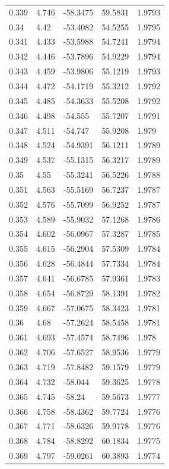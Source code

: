 \begin{tabular}{lllll}
0.339 & 4.746 & -58.3475 & 59.5831 & 1.9793 \\
0.34 & 4.42 & -53.4082 & 54.5255 & 1.9795 \\
0.341 & 4.433 & -53.5988 & 54.7241 & 1.9794 \\
0.342 & 4.446 & -53.7896 & 54.9229 & 1.9794 \\
0.343 & 4.459 & -53.9806 & 55.1219 & 1.9793 \\
0.344 & 4.472 & -54.1719 & 55.3212 & 1.9792 \\
0.345 & 4.485 & -54.3633 & 55.5208 & 1.9792 \\
0.346 & 4.498 & -54.555 & 55.7207 & 1.9791 \\
0.347 & 4.511 & -54.747 & 55.9208 & 1.979 \\
0.348 & 4.524 & -54.9391 & 56.1211 & 1.9789 \\
0.349 & 4.537 & -55.1315 & 56.3217 & 1.9789 \\
0.35 & 4.55 & -55.3241 & 56.5226 & 1.9788 \\
0.351 & 4.563 & -55.5169 & 56.7237 & 1.9787 \\
0.352 & 4.576 & -55.7099 & 56.9252 & 1.9787 \\
0.353 & 4.589 & -55.9032 & 57.1268 & 1.9786 \\
0.354 & 4.602 & -56.0967 & 57.3287 & 1.9785 \\
0.355 & 4.615 & -56.2904 & 57.5309 & 1.9784 \\
0.356 & 4.628 & -56.4844 & 57.7334 & 1.9784 \\
0.357 & 4.641 & -56.6785 & 57.9361 & 1.9783 \\
0.358 & 4.654 & -56.8729 & 58.1391 & 1.9782 \\
0.359 & 4.667 & -57.0675 & 58.3423 & 1.9781 \\
0.36 & 4.68 & -57.2624 & 58.5458 & 1.9781 \\
0.361 & 4.693 & -57.4574 & 58.7496 & 1.978 \\
0.362 & 4.706 & -57.6527 & 58.9536 & 1.9779 \\
0.363 & 4.719 & -57.8482 & 59.1579 & 1.9779 \\
0.364 & 4.732 & -58.044 & 59.3625 & 1.9778 \\
0.365 & 4.745 & -58.24 & 59.5673 & 1.9777 \\
0.366 & 4.758 & -58.4362 & 59.7724 & 1.9776 \\
0.367 & 4.771 & -58.6326 & 59.9778 & 1.9776 \\
0.368 & 4.784 & -58.8292 & 60.1834 & 1.9775 \\
0.369 & 4.797 & -59.0261 & 60.3893 & 1.9774 \\

\end{tabular}
